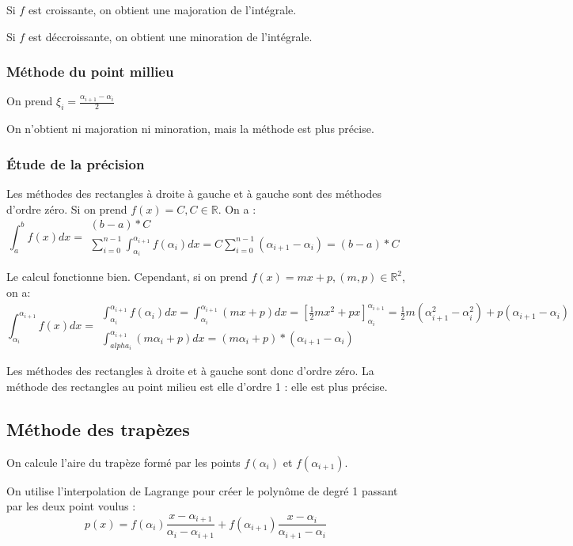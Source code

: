 \documentclass{article}
\begin{document}
Si $f$ est croissante, on obtient une majoration de l'intégrale.

Si $f$ est déccroissante, on obtient une minoration de l'intégrale.

\subsubsection{Méthode du point millieu}
On prend $\xi_i = \frac{\alpha_{i+1} - \alpha_i}{2}$

On n'obtient ni majoration ni minoration, mais la méthode est plus précise.

\subsubsection{Étude de la précision}
Les méthodes des rectangles à droite à gauche et à gauche sont des méthodes d'ordre zéro. Si on prend $f(x) = C, C\in\mathbb{R}$. On a :
\[ \int_a^b f(x)dx = \begin{array}{l}
            (b-a) * C \\
            \sum_{i=0}^{n-1}\int_{\alpha_i}^{\alpha_{i+1}} f(\alpha_i)dx = C\sum_{i=0}^{n-1}(\alpha_{i+1} - \alpha_i) = (b-a) * C
        \end{array}
\]

Le calcul fonctionne bien. Cependant, si on prend $f(x) = mx+p, (m,p)\in\mathbb{R}^2$, on a:
\[ \int_{\alpha_i}^{\alpha_{i+1}} f(x)dx = \begin{array}{l}
        \int_{\alpha_i}^{\alpha_{i+1}} f(\alpha_i)dx = \int_{\alpha_i}^{\alpha_{i+1}} (mx+p)dx = \left[\frac{1}{2}mx^2+px\right]_{\alpha_i}^{\alpha_{i+1}} = \frac{1}{2}m(\alpha_{i+1}^2 - \alpha_i^2) + p(\alpha_{i+1} - \alpha_i) \\
        \int_{alpha_i}^{\alpha_{i+1}} (m\alpha_i+p)dx = (m\alpha_i+p) * (\alpha_{i+1} - \alpha_i)
    \end{array}
\]

Les méthodes des rectangles à droite et à gauche sont donc d'ordre zéro. La méthode des rectangles au point milieu est elle d'ordre 1 : elle est plus précise.

\subsection{Méthode des trapèzes}
On calcule l'aire du trapèze formé par les points $f(\alpha_i)$ et $f(\alpha_{i+1})$.

On utilise l'interpolation de Lagrange pour créer le polynôme de degré 1 passant par les deux point voulus : \begin{equation}
    p(x) = f(\alpha_i)\frac{x - \alpha_{i+1}}{\alpha_i-\alpha_{i+1}} + f(\alpha_{i+1})\frac{x - \alpha_i}{\alpha_{i+1} - \alpha_i}
\end{equation}
\end{document}
